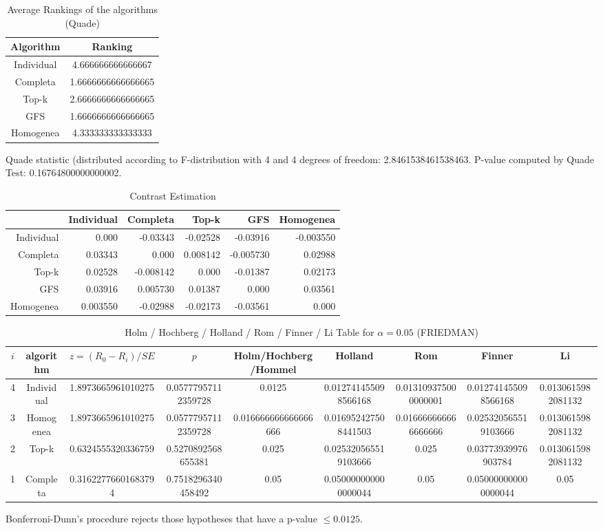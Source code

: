 \documentclass[a4paper,10pt]{article}
\begin{document}
\begin{landscape}
\newpage

\begin{table}[!htp]
\centering
\caption{Average Rankings of the algorithms (Quade)
}\begin{tabular}{c|c}
Algorithm&Ranking\\
\hline
Individual&4.666666666666667\\
Completa&1.6666666666666665\\
Top-k&2.6666666666666665\\
GFS&1.6666666666666665\\
Homogenea&4.333333333333333\\
\end{tabular}
\end{table}
Quade statistic (distributed according to F-distribution with 4 and 4 degrees of freedom: 2.8461538461538463. 
P-value computed by Quade Test: 0.16764800000000002.\newline


\newpage

\begin{table}[!htp]
\centering\tiny
\caption{Contrast Estimation}
\begin{tabular}{
|r|r|r|r|r|r|}
\hline
 &Individual&Completa&Top-k&GFS&Homogenea\\
\hline
Individual&0.000&-0.03343&-0.02528&-0.03916&-0.003550\\
\hline
Completa&0.03343&0.000&0.008142&-0.005730&0.02988\\
\hline
Top-k&0.02528&-0.008142&0.000&-0.01387&0.02173\\
\hline
GFS&0.03916&0.005730&0.01387&0.000&0.03561\\
\hline
Homogenea&0.003550&-0.02988&-0.02173&-0.03561&0.000\\
\hline

\end{tabular}
\end{table}

\newpage

\begin{table}[!htp]
\centering\scriptsize
\caption{Holm / Hochberg / Holland / Rom / Finner / Li Table for $\alpha=0.05$ (FRIEDMAN)}
\begin{tabular}{ccccccccc}
$i$&algorithm&$z=(R_0 - R_i)/SE$&$p$&Holm/Hochberg/Hommel&Holland&Rom&Finner&Li\\
\hline
4&Individual&1.8973665961010275&0.05777957112359728&0.0125&0.012741455098566168&0.013109375000000001&0.012741455098566168&0.0130615982081132\\
3&Homogenea&1.8973665961010275&0.05777957112359728&0.016666666666666666&0.016952427508441503&0.016666666666666666&0.025320565519103666&0.0130615982081132\\
2&Top-k&0.6324555320336759&0.5270892568655381&0.025&0.025320565519103666&0.025&0.03773939976903784&0.0130615982081132\\
1&Completa&0.31622776601683794&0.7518296340458492&0.05&0.050000000000000044&0.05&0.050000000000000044&0.05\\
\hline
\end{tabular}
\end{table}
Bonferroni-Dunn's procedure rejects those hypotheses that have a p-value $\le0.0125$.



\end{landscape}
\end{document}
